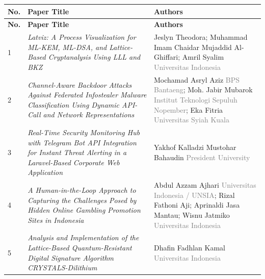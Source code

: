 \documentclass[10pt,a4paper]{article}
\begin{document}
\vspace{0.5em}

\small
\renewcommand{\arraystretch}{1.25}
\setlength{\tabcolsep}{5pt}

\begin{longtable}{
    |>{\centering\arraybackslash}p{0.7cm}
    |>{\raggedright\arraybackslash}p{8.2cm}
    |>{\raggedright\arraybackslash}p{5.0cm}|
}
\hline
\rowcolor{conf}
\color{white}\textbf{No.} &
\color{white}\textbf{Paper Title} &
\color{white}\textbf{Authors} \\
\hline
\endfirsthead

\hline
\rowcolor{conf}
\color{white}\textbf{No.} &
\color{white}\textbf{Paper Title} &
\color{white}\textbf{Authors} \\
\hline
\endhead

1 &
\textit{Latviz: A Process Visualization for ML-KEM, ML-DSA, and Lattice-Based Cryptanalysis Using LLL and BKZ} &
Jeslyn Theodora; Muhammad Imam Chaidar Mujaddid Al-Ghiffari; Amril Syalim \newline
\textcolor{gray}{Universitas Indonesia} \\
\hline

2 &
\textit{Channel-Aware Backdoor Attacks Against Federated Infostealer Malware Classification Using Dynamic API-Call and Network Representations} &
Mochamad Asryl Aziz \newline
\textcolor{gray}{BPS Bantaeng}; Moh. Jabir Mubarok \newline
\textcolor{gray}{Institut Teknologi Sepuluh Nopember}; Eka Fitria \newline
\textcolor{gray}{Universitas Syiah Kuala} \\
\hline

3 &
\textit{Real-Time Security Monitoring Hub with Telegram Bot API Integration for Instant Threat Alerting in a Laravel-Based Corporate Web Application} &
Yakhof Kalladzi Mustohar Bahaudin \newline
\textcolor{gray}{President University} \\
\hline

4 &
\textit{A Human-in-the-Loop Approach to Capturing the Challenges Posed by Hidden Online Gambling Promotion Sites in Indonesia} &
Abdul Azzam Ajhari \newline
\textcolor{gray}{Universitas Indonesia / UNSIA}; Rizal Fathoni Aji; Aprinaldi Jasa Mantau; Wisnu Jatmiko \newline
\textcolor{gray}{Universitas Indonesia} \\
\hline

5 &
\textit{Analysis and Implementation of the Lattice-Based Quantum-Resistant Digital Signature Algorithm CRYSTALS-Dilithium} &
Dhafin Fadhlan Kamal \newline
\textcolor{gray}{Universitas Indonesia} \\
\hline
\end{longtable}
\normalsize
\end{document}
